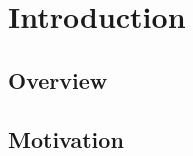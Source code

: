 \chapter{Introduction}
\label{chapter:Introduction}
\thispagestyle{myheadings}

\section{Overview} %
\label{sec:overview}


\section{Motivation}
\label{sec:Motivation}
